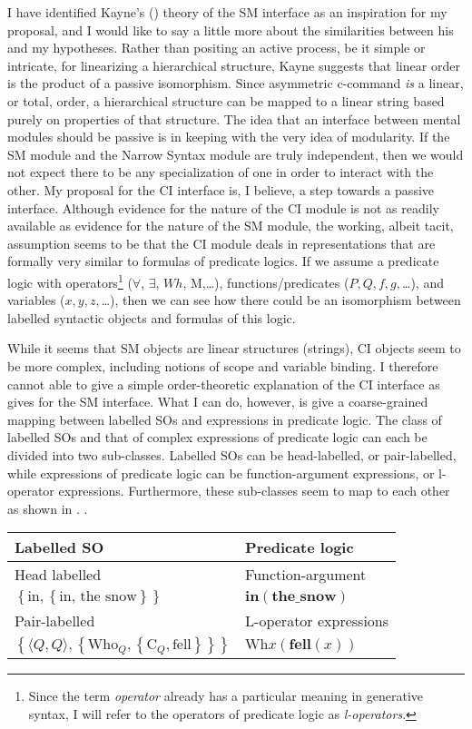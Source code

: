 \documentclass[MilwayThesis]{subfiles}
\begin{document}
I have identified Kayne's (\citeyear{kayne1994antisymmetry}) theory of the SM interface as an inspiration for my proposal, and I would like to say a little more about the similarities between his and my hypotheses.
Rather than positing an active process, be it simple or intricate, for linearizing a hierarchical structure, Kayne suggests that linear order is the product of a passive isomorphism.
Since asymmetric c-command \textit{is} a linear, or total, order, a hierarchical structure can be mapped to a linear string based purely on properties of that structure.
The idea that an interface between mental modules should be passive is in keeping with the very idea of modularity.
If the SM module and the Narrow Syntax module are truly independent, then we would not expect there to be any specialization of one in order to interact with the other.
My proposal for the CI interface is, I believe, a step towards a passive interface.
Although evidence for the nature of the CI module is not as readily available as evidence for the nature of the SM module, the working, albeit tacit, assumption seems to be that the CI module deals in representations that are formally very similar to formulas of predicate logics.
If we assume a predicate logic with operators\footnote{Since the term \textit{operator} already has a particular meaning in generative syntax, I will refer to the operators of predicate logic as \textit{l-operators}.} ($\forall$, $\exists$, $Wh$, M,\ldots), functions/predicates ($P, Q, f, g,$\ldots), and variables ($x, y, z,$\ldots), then we can see how there could be an isomorphism between labelled syntactic objects and formulas of this logic.

While it seems that SM objects are linear structures (strings), CI objects seem to be more complex, including notions of scope and variable binding.
I therefore cannot able to give a simple order-theoretic explanation of the CI interface as \textcite{kayne1994antisymmetry} gives for the SM interface.
What I can do, however, is give a coarse-grained mapping between labelled SOs and expressions in predicate logic.
The class of labelled SOs and that of complex expressions of predicate logic can each be divided into two sub-classes.
Labelled SOs can be head-labelled, or pair-labelled, while expressions of predicate logic can be function-argument expressions, or l-operator expressions.
Furthermore, these sub-classes seem to map to each other as shown in \Next.
\ex.
\begin{tabular}[t]{ll}
	Labelled SO & Predicate logic\\
	\hline
	\hline
	Head labelled & Function-argument\\
	$\left\{ \text{in}, \left\{ \text{in, the snow} \right\} \right\}$ & $\textbf{in}(\textbf{the\_snow})$\\
	\hline
	Pair-labelled & L-operator expressions\\
	$\left\{ \langle Q,Q\rangle, \left\{\text{Who}_Q, \left\{\text{C}_Q, \text{fell} \right\}  \right\} \right\}$ & $\text{Wh}x(\textbf{fell}(x))$\\
	\hline
\end{tabular}
\end{document}
